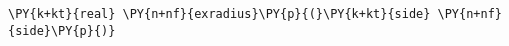 \begin{Verbatim}[commandchars=\\\{\}]
    \PY{k+kt}{real} \PY{n+nf}{exradius}\PY{p}{(}\PY{k+kt}{side} \PY{n+nf}{side}\PY{p}{)}
\end{Verbatim}

